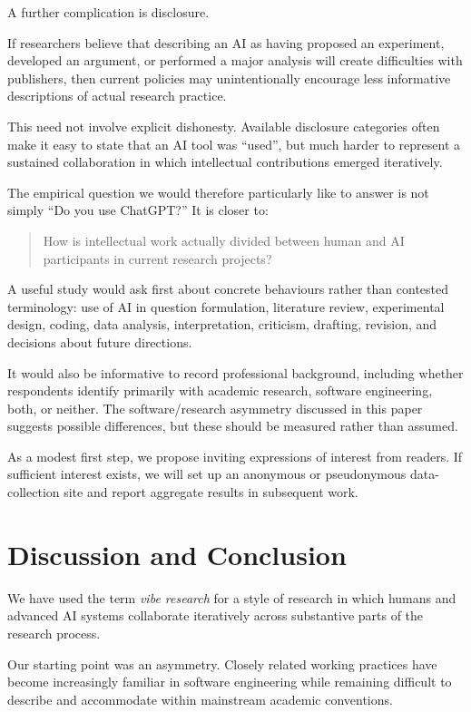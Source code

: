 A further complication is disclosure.

If researchers believe that describing an AI as having proposed an experiment, developed an argument, or performed a major analysis will create difficulties with publishers, then current policies may unintentionally encourage less informative descriptions of actual research practice.

This need not involve explicit dishonesty. Available disclosure categories often make it easy to state that an AI tool was ``used'', but much harder to represent a sustained collaboration in which intellectual contributions emerged iteratively.

The empirical question we would therefore particularly like to answer is not simply ``Do you use ChatGPT?'' It is closer to:

\begin{quote}
How is intellectual work actually divided between human and AI participants in current research projects?
\end{quote}

A useful study would ask first about concrete behaviours rather than contested terminology: use of AI in question formulation, literature review, experimental design, coding, data analysis, interpretation, criticism, drafting, revision, and decisions about future directions.

It would also be informative to record professional background, including whether respondents identify primarily with academic research, software engineering, both, or neither. The software/research asymmetry discussed in this paper suggests possible differences, but these should be measured rather than assumed.

As a modest first step, we propose inviting expressions of interest from readers. If sufficient interest exists, we will set up an anonymous or pseudonymous data-collection site and report aggregate results in subsequent work.


\section{Discussion and Conclusion}

We have used the term \emph{vibe research} for a style of research in which humans and advanced AI systems collaborate iteratively across substantive parts of the research process.

Our starting point was an asymmetry. Closely related working practices have become increasingly familiar in software engineering while remaining difficult to describe and accommodate within mainstream academic conventions.


